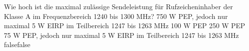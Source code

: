     {Wie hoch ist die maximal zulässige Sendeleistung für Rufzeicheninhaber der Klasse A im Frequenzbereich 1240 bis 1300 MHz?}
    {750 W PEP, jedoch nur maximal 5 W EIRP im Teilbereich 1247 bis 1263 MHz}
    {100 W PEP}
    {250 W PEP}
    {75 W PEP, jedoch nur maximal 5 W EIRP im Teilbereich 1247 bis 1263 MHz}
    {false}{false}